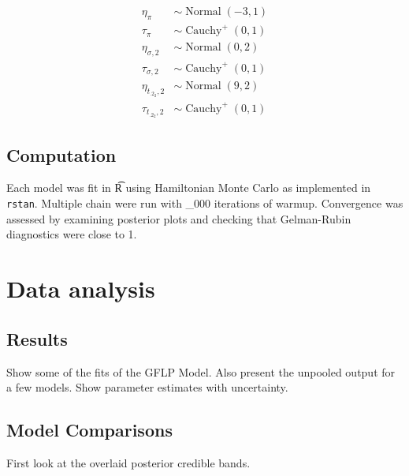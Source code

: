 \documentclass[12pt]{article}
\newcommand{\op}{\operatorname}
\begin{document}
\begin{align*}
  \eta_{\pi} & \sim \op{Normal}(-3, 1)\\
  \tau_{\pi} & \sim \op{Cauchy}^+(0, 1)\\
  \eta_{\sigma ,2} & \sim \op{Normal}(0, 2)\\
  \tau_{\sigma ,2} & \sim \op{Cauchy}^+(0, 1)\\
  \eta_{t_{.2_2},2} & \sim \op{Normal}(9, 2)\\
  \tau_{t_{.2_2},2} & \sim \op{Cauchy}^+(0, 1)
 \end{align*} 

\subsection{Computation}
Each model was fit in {\t R} \nocite{r} using Hamiltonian Monte Carlo
\cite{betancourt} as implemented in {\tt
  rstan}\cite{rstan}. Multiple chain were run with _000 iterations of
warmup. Convergence was assessed by examining posterior
plots and checking that Gelman-Rubin diagnostics were close to 1.

\section{Data analysis}
\subsection{Results}
Show some of the fits of the GFLP Model.  Also present the unpooled output for a few models.  Show parameter estimates with uncertainty. 

\subsection{Model Comparisons}
First look at the overlaid posterior credible bands. \\
\end{document}
